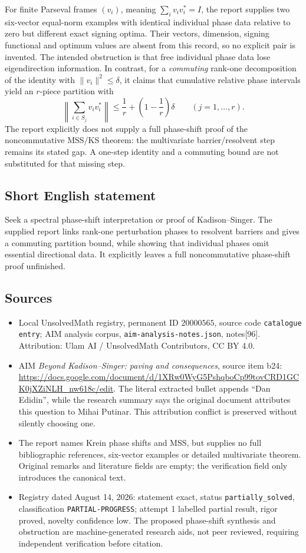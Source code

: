 \documentclass[11pt]{article}
\begin{document}
For finite Parseval frames \((v_i)\), meaning \(\sum_i v_iv_i^*=I\), the report supplies two six-vector equal-norm examples with identical individual phase data relative to zero but different exact signing optima. Their vectors, dimension, signing functional and optimum values are absent from this record, so no explicit pair is invented. The intended obstruction is that free individual phase data lose eigendirection information. In contrast, for a \emph{commuting} rank-one decomposition of the identity with \(\|v_i\|^2\le\delta\), it claims that cumulative relative phase intervals yield an \(r\)-piece partition with
\[
 \left\|\sum_{i\in S_j}v_iv_i^*\right\|
 \le\frac1r+\left(1-\frac1r\right)\delta\qquad(j=1,\ldots,r).
\]
The report explicitly does not supply a full phase-shift proof of the noncommutative MSS/KS theorem: the multivariate barrier/resolvent step remains its stated gap. A one-step identity and a commuting bound are not substituted for that missing step.
\subsection{Short English statement}
Seek a spectral phase-shift interpretation or proof of Kadison--Singer. The supplied report links rank-one perturbation phases to resolvent barriers and gives a commuting partition bound, while showing that individual phases omit essential directional data. It explicitly leaves a full noncommutative phase-shift proof unfinished.
\subsection{Sources}
\begin{itemize}
\item Local UnsolvedMath registry, permanent ID \(20000565\), source code \texttt{catalogue entry}; AIM analysis corpus, \texttt{aim-analysis-notes.json}, notes[96]. Attribution: Ulam AI / UnsolvedMath Contributors, CC BY 4.0.
\item AIM \emph{Beyond Kadison--Singer: paving and consequences}, source item b24: \url{https://docs.google.com/document/d/1XRw0WyG5PshqboCp99tovCRD1GCK0jXZiNLH_nw618c/edit}. The literal extracted bullet appends ``Dan Edidin'', while the research summary says the original document attributes this question to Mihai Putinar. This attribution conflict is preserved without silently choosing one.
\item The report names Krein phase shifts and MSS, but supplies no full bibliographic references, six-vector examples or detailed multivariate theorem. Original remarks and literature fields are empty; the verification field only introduces the canonical text.
\item Registry dated August 14, 2026: statement exact, status \texttt{partially\_solved}, classification \texttt{PARTIAL-PROGRESS}; attempt 1 labelled partial result, rigor proved, novelty confidence low. The proposed phase-shift synthesis and obstruction are machine-generated research aids, not peer reviewed, requiring independent verification before citation.
\end{itemize}
\end{document}
